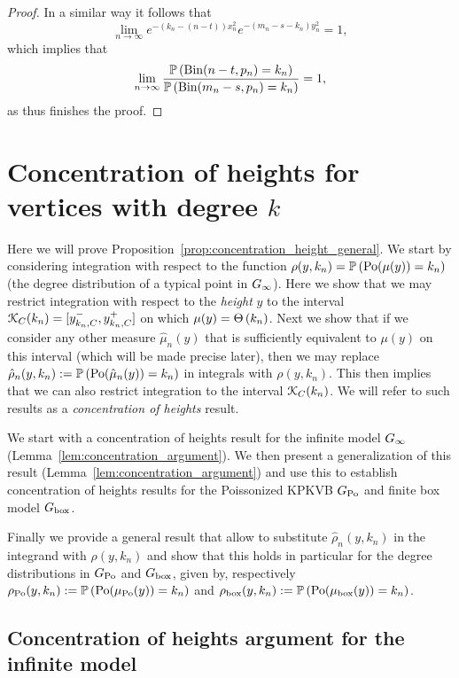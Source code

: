 \begin{appendices}
\begin{proof}
In a similar way it follows that
\[
	\lim_{n \to \infty} e^{-(k_n - (n-t))x_n^2}e^{-(m_n - s - k_n)y_n^2} = 1,
\]
which implies that
\[
	\lim_{n \to \infty} \frac{\mathbb{P}\left(\mathrm{Bin}(n-t,p_n) = k_n\right)}{\mathbb{P}\left(\mathrm{Bin}(m_n-s,p_n) = k_n\right)}
	= 1,
\] 
as thus finishes the proof.
\end{proof}

\section{Concentration of heights for vertices with degree $k$}\label{sec:concentration_argument}

Here we will prove Proposition~\ref{prop:concentration_height_general}. We start by considering integration with respect to the function $\rho(y,k_n) = \mathbb{P}\left({\mathrm{Po}}(\mu(y)) = k_n\right)$ (the degree distribution of a typical point in $G_{\infty}$). Here we show that we may restrict integration with respect to the \emph{height} $y$ to the interval ${\mathcal K}_C(k_n) = [y_{k_n,C}^-, y_{k_n,C}^+]$ on which $\mu(y) = \Theta\left(k_n\right)$. Next we show that if we consider any other measure $\hat{\mu}_n(y)$ that is sufficiently equivalent to $\mu(y)$ on this interval (which will be made precise later), then we may replace $\hat{\rho}_n(y,k_n) := \mathbb{P}\left({\mathrm{Po}}(\hat{\mu}_n(y)) = k_n\right)$ in integrals with $\rho(y,k_n)$. This then implies that we can also restrict integration to the interval ${\mathcal K}_C(k_n)$. We will refer to such results as a \emph{concentration of heights} result.

We start with a concentration of heights result for the infinite model $G_{\infty}$ (Lemma~\ref{lem:concentration_argument}). We then present a generalization of this result (Lemma~\ref{lem:concentration_argument}) and use this to establish concentration of heights results for the Poissonized KPKVB $G_{{\mathrm{Po}}}$ and finite box model $G_{\mathrm{box}}$. 

Finally we provide a general result that allow to substitute $\hat{\rho}_n(y,k_n)$ in the integrand with $\rho(y,k_n)$ and show that this holds in particular for the degree distributions in $G_{{\mathrm{Po}}}$ and $G_{\mathrm{box}}$, given by, respectively $\rho_{{\mathrm{Po}}}(y,k_n) := \mathbb{P}\left({\mathrm{Po}}(\mu_{{\mathrm{Po}}}(y)) = k_n\right)$ and $\rho_{\text{box}}(y,k_n) := \mathbb{P}\left({\mathrm{Po}}(\mu_{\mathrm{box}}(y)) = k_n\right)$.

\subsection{Concentration of heights argument for the infinite model}


\end{appendices}
